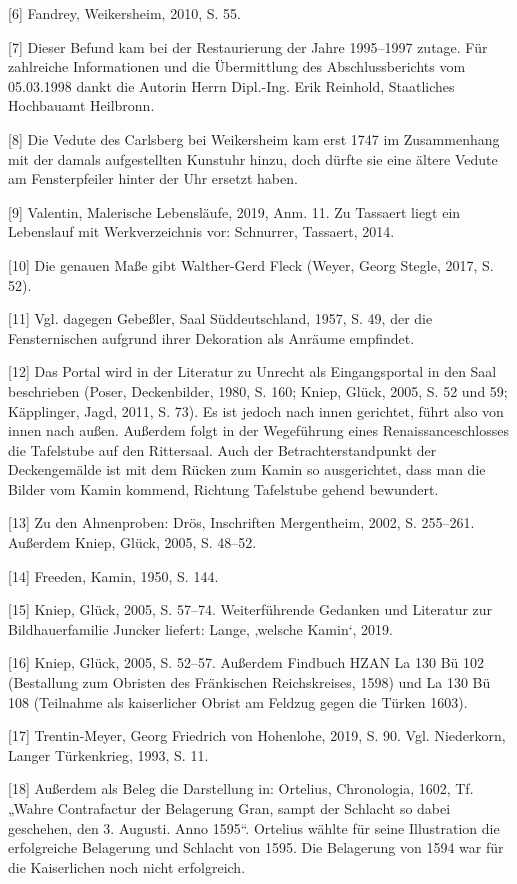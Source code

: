 \documentclass[
  a4paper,
  openany]{book}
\begin{document}
{[}6{]} Fandrey, Weikersheim, 2010, S. 55.

{[}7{]} Dieser Befund kam bei der Restaurierung der Jahre 1995--1997
zutage. Für zahlreiche Informationen und die Übermittlung des
Abschlussberichts vom 05.03.1998 dankt die Autorin Herrn Dipl.-Ing. Erik
Reinhold, Staatliches Hochbauamt Heilbronn.

{[}8{]} Die Vedute des Carlsberg bei Weikersheim kam erst 1747 im
Zusammenhang mit der damals aufgestellten Kunstuhr hinzu, doch dürfte
sie eine ältere Vedute am Fensterpfeiler hinter der Uhr ersetzt haben.

{[}9{]} Valentin, Malerische Lebensläufe, 2019, Anm. 11. Zu Tassaert
liegt ein Lebenslauf mit Werkverzeichnis vor: Schnurrer, Tassaert, 2014.

{[}10{]} Die genauen Maße gibt Walther-Gerd Fleck (Weyer, Georg Stegle,
2017, S. 52).

{[}11{]} Vgl. dagegen Gebeßler, Saal Süddeutschland, 1957, S. 49, der
die Fensternischen aufgrund ihrer Dekoration als Anräume empfindet.

{[}12{]} Das Portal wird in der Literatur zu Unrecht als Eingangsportal
in den Saal beschrieben (Poser, Deckenbilder, 1980, S. 160; Kniep,
Glück, 2005, S. 52 und 59; Käpplinger, Jagd, 2011, S. 73). Es ist jedoch
nach innen gerichtet, führt also von innen nach außen. Außerdem folgt in
der Wegeführung eines Renaissanceschlosses die Tafelstube auf den
Rittersaal. Auch der Betrachterstandpunkt der Deckengemälde ist mit dem
Rücken zum Kamin so ausgerichtet, dass man die Bilder vom Kamin kommend,
Richtung Tafelstube gehend bewundert.

{[}13{]} Zu den Ahnenproben: Drös, Inschriften Mergentheim, 2002, S.
255--261. Außerdem Kniep, Glück, 2005, S. 48--52.

{[}14{]} Freeden, Kamin, 1950, S. 144.

{[}15{]} Kniep, Glück, 2005, S. 57--74. Weiterführende Gedanken und
Literatur zur Bildhauerfamilie Juncker liefert: Lange, ‚welsche Kamin`,
2019.

{[}16{]} Kniep, Glück, 2005, S. 52--57. Außerdem Findbuch HZAN La 130 Bü
102 (Bestallung zum Obristen des Fränkischen Reichskreises, 1598) und La
130 Bü 108 (Teilnahme als kaiserlicher Obrist am Feldzug gegen die
Türken 1603).

{[}17{]} Trentin-Meyer, Georg Friedrich von Hohenlohe, 2019, S. 90. Vgl.
Niederkorn, Langer Türkenkrieg, 1993, S. 11.

{[}18{]} Außerdem als Beleg die Darstellung in: Ortelius, Chronologia,
1602, Tf. „Wahre Contrafactur der Belagerung Gran, sampt der Schlacht so
dabei geschehen, den 3. Augusti. Anno 1595``. Ortelius wählte für seine
Illustration die erfolgreiche Belagerung und Schlacht von 1595. Die
Belagerung von 1594 war für die Kaiserlichen noch nicht erfolgreich.
\end{document}
